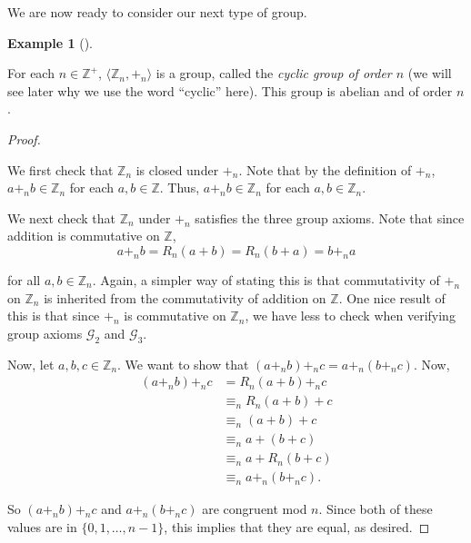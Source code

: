 \documentclass[10pt,]{book}
\theoremstyle{plain}
\theoremstyle{definition}
\theoremstyle{definition}
\theoremstyle{definition}
\newtheorem{example}[theorem]{Example}
\theoremstyle{definition}
\numberwithin{equation}{section}
\def\Z{\mathbb{Z}}
\def\G{\mathcal{G}}
\newcommand{\amp}{ & }
\begin{document}
    We are now ready to consider our next type of group.
\begin{example}[]\label{example-18}

        For each \(n\in \Z^+\), \(\langle \Z_n,+_n\rangle\) is a group, called the \emph{cyclic group of order \(n\)} (we will see later why we use the word ``cyclic'' here).
        This group is abelian and of order \(n\).
\label{notation-43}
\begin{proof}\hypertarget{proof-14}{}

        We first check that \(\Z_n\) is closed under \(+_n\). Note
        that by the definition of \(+_n\), \(a+_nb \in \Z_n\) for each
        \(a,b\in \Z\). Thus, \(a+_nb \in \Z_n\) for each \(a,b\in \Z_n\).
\par

        We next check that \(\Z_n\) under \(+_n\) satisfies the three group
        axioms. Note that since addition is commutative on \(\Z\),
\begin{equation*}

          a+_n
          b =R_n(a+b)=R_n(b+a)=b+_n a
        
\end{equation*}

        for all \(a,b\in \Z_n\). Again, a
        simpler way of stating this is that commutativity of \(+_n\) on
        \(\Z_n\) is inherited from the commutativity of addition on \(\Z\).
        One nice result of this is that since \(+_n\) is commutative on
        \(\Z_n\), we have less to check when verifying group axioms
        \(\G_2\) and \(\G_3\).%
\par

              Now, let \(a,b,c\in \Z_n\).  We want to show that
              \((a+_n b)+_n c = a +_n(b+_n c)\). Now,
\begin{align*}
(a+_n b)+_n c\amp =R_n(a+b)+_n c\\
\amp \equiv_n R_n(a+b)+c\\\
\amp \equiv_n (a+b)+c\\\
\amp \equiv_n a+(b+c)\\
\amp \equiv_n a+R_n(b+c)\\
\amp \equiv_n a+_n (b+_n c).
\end{align*}

              So \((a+_n b)+_n c\) and \(a+_n (b+_n c)\) are congruent mod \(n\).  Since
              both of these values are in \(\{0,1,\ldots, n-1\}\), this implies that
              they are equal, as desired.
\par


\end{proof}
\end{example}
\end{document}
